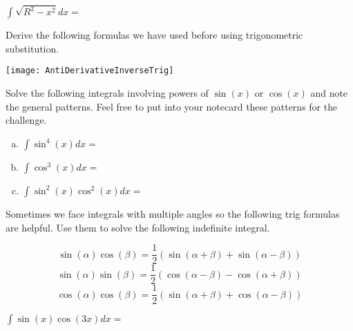 \documentclass[answers]{exam}
\begin{document}
\begin{questions}
$\displaystyle  \int \sqrt{R^2-x^2} dx = $

\vspace{2in}

\newpage


\question Derive the following formulas we have used before using trigonometric substitution.

\texttt{[image: AntiDerivativeInverseTrig]}


\vspace{4in}


\question Solve the following integrals involving powers of $\sin(x)$ or $\cos(x)$ and note the general patterns. Feel free to put into your notecard these patterns for the challenge.
\begin{enumerate}[(a)]
	
	\item $\displaystyle \int \sin^4(x) dx =$
	
	\vspace{2in}

	\newpage
	
	
	\item $\displaystyle \int \cos^3(x) dx =$
	
	\hfill \break
	\hfill \break
	\hfill \break
	\hfill \break
	\hfill \break
	\hfill \break
	\hfill \break
	\hfill \break
	\hfill \break
	\hfill \break
	\hfill \break
	\hfill \break
	
	
	\item $\displaystyle \int \sin^2(x)\cos^2(x) dx =$ 
	
	\hfill \break
	\hfill \break
	\hfill \break
	\hfill \break
	\hfill \break
	\hfill \break
	\hfill \break
	\hfill \break
	\hfill \break
	\hfill \break
	\hfill \break
	\hfill \break
	\hfill \break
	\hfill \break
	\hfill \break
	\hfill \break
	\hfill \break
	
	

	
\end{enumerate}

\question Sometimes we face integrals with multiple angles so the following trig formulas are helpful. Use them to solve the following indefinite integral.

 \[\sin(\alpha)\cos(\beta) = \frac{1}{2}(\sin(\alpha + \beta) + \sin(\alpha-\beta))\]  \[\sin(\alpha)\sin(\beta) = \frac{1}{2}(\cos(\alpha - \beta) - \cos(\alpha+\beta))\]
\[\cos(\alpha)\cos(\beta) = \frac{1}{2}(\sin(\alpha + \beta) + \cos(\alpha-\beta))\]


$\displaystyle \int \sin(x)\cos(3x) dx =$ 


\end{questions}
\end{document}
